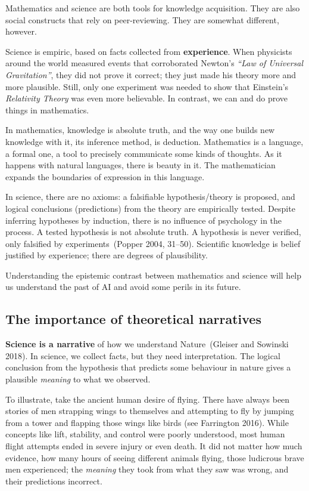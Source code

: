 \documentclass[
  letterpaper,
]{tufte-book}
\begin{document}
Mathematics and science are both tools for knowledge acquisition. They
are also social constructs that rely on peer-reviewing. They are
somewhat different, however.

Science is empiric, based on facts collected from \textbf{experience}.
When physicists around the world measured events that corroborated
Newton's \emph{``Law of Universal Gravitation''}, they did not prove it
correct; they just made his theory more and more plausible. Still, only
one experiment was needed to show that Einstein's \emph{Relativity
Theory} was even more believable. In contrast, we can and do prove
things in mathematics.

In mathematics, knowledge is absolute truth, and the way one builds new
knowledge with it, its inference method, is deduction. Mathematics is a
language, a formal one, a tool to precisely communicate some kinds of
thoughts. As it happens with natural languages, there is beauty in it.
The mathematician expands the boundaries of expression in this language.

In science, there are no axioms: a falsifiable hypothesis/theory is
proposed, and logical conclusions (predictions) from the theory are
empirically tested. Despite inferring hypotheses by induction, there is
no influence of psychology in the process. A tested hypothesis is not
absolute truth. A hypothesis is never verified, only falsified by
experiments~(Popper 2004, 31--50). Scientific knowledge is belief
justified by experience; there are degrees of plausibility.

Understanding the epistemic contrast between mathematics and science
will help us understand the past of {AI} and avoid some perils in its
future.

\hypertarget{the-importance-of-theoretical-narratives}{%
\subsection{The importance of theoretical
narratives}\label{the-importance-of-theoretical-narratives}}

\textbf{Science is a narrative} of how we understand Nature~(Gleiser and
Sowinski 2018). In science, we collect facts, but they need
interpretation. The logical conclusion from the hypothesis that predicts
some behaviour in nature gives a plausible \emph{meaning} to what we
observed.

To illustrate, take the ancient human desire of flying. There have
always been stories of men strapping wings to themselves and attempting
to fly by jumping from a tower and flapping those wings like birds (see
Farrington 2016). While concepts like lift, stability, and control were
poorly understood, most human flight attempts ended in severe injury or
even death. It did not matter how much evidence, how many hours of
seeing different animals flying, those ludicrous brave men experienced;
the \emph{meaning} they took from what they saw was wrong, and their
predictions incorrect.
\end{document}
